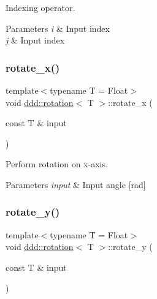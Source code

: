 Indexing operator. 


\begin{DoxyParams}{Parameters}
{\em i} & Input index \\
\hline
{\em j} & Input index \\
\hline
\end{DoxyParams}
\mbox{\label{classddd_1_1rotation_af4bd213ca0cf7d372f840cbfd9d37696}} 
\subsubsection{\texorpdfstring{rotate\+\_\+x()}{rotate\_x()}}
{\footnotesize\ttfamily template$<$typename T  = Float$>$ \\
void \hyperlink{classddd_1_1rotation}{ddd\+::rotation}$<$ T $>$\+::rotate\+\_\+x (\begin{DoxyParamCaption}\item[{const T \&}]{input }\end{DoxyParamCaption})\hspace{0.3cm}{\ttfamily [inline]}}



Perform rotation on x-\/axis. 


\begin{DoxyParams}{Parameters}
{\em input} & Input angle \mbox{[}rad\mbox{]} \\
\hline
\end{DoxyParams}
\mbox{\label{classddd_1_1rotation_a4f883c5c4c736387fa14f1362d90a90c}} 
\subsubsection{\texorpdfstring{rotate\+\_\+y()}{rotate\_y()}}
{\footnotesize\ttfamily template$<$typename T  = Float$>$ \\
void \hyperlink{classddd_1_1rotation}{ddd\+::rotation}$<$ T $>$\+::rotate\+\_\+y (\begin{DoxyParamCaption}\item[{const T \&}]{input }\end{DoxyParamCaption})\hspace{0.3cm}{\ttfamily [inline]}}



